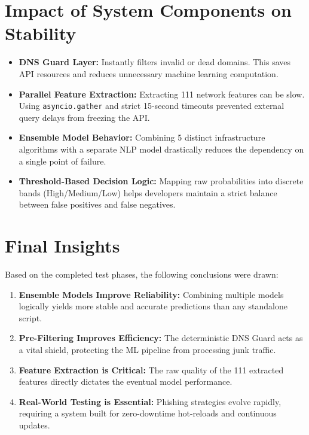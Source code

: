 \section{Impact of System Components on Stability}

\begin{itemize}
    \item \textbf{DNS Guard Layer:}
    Instantly filters invalid or dead domains. This saves API resources and reduces unnecessary machine learning computation.

    \item \textbf{Parallel Feature Extraction:}
    Extracting 111 network features can be slow. Using \texttt{asyncio.gather} and strict 15-second timeouts prevented external query delays from freezing the API.

    \item \textbf{Ensemble Model Behavior:}
    Combining 5 distinct infrastructure algorithms with a separate NLP model drastically reduces the dependency on a single point of failure.

    \item \textbf{Threshold-Based Decision Logic:}
    Mapping raw probabilities into discrete bands (High/Medium/Low) helps developers maintain a strict balance between false positives and false negatives.
\end{itemize}

\section{Final Insights}
\noindent
Based on the completed test phases, the following conclusions were drawn:

\begin{enumerate}
    \item \textbf{Ensemble Models Improve Reliability:} Combining multiple models logically yields more stable and accurate predictions than any standalone script.
    \item \textbf{Pre-Filtering Improves Efficiency:} The deterministic DNS Guard acts as a vital shield, protecting the ML pipeline from processing junk traffic.
    \item \textbf{Feature Extraction is Critical:} The raw quality of the 111 extracted features directly dictates the eventual model performance.
    \item \textbf{Real-World Testing is Essential:} Phishing strategies evolve rapidly, requiring a system built for zero-downtime hot-reloads and continuous updates.
\end{enumerate}
